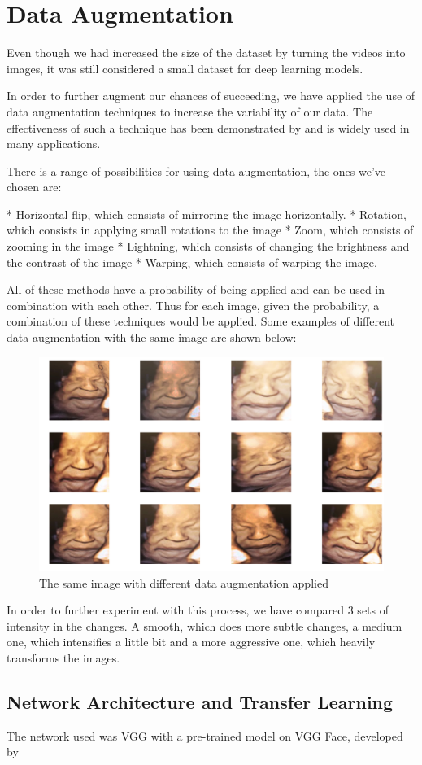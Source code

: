 \section{Data Augmentation}

Even though we had increased the size of the dataset by turning the videos into images, it was still considered a small dataset for deep learning models. 

In order to further augment our chances of succeeding, we have applied the use of data augmentation techniques to increase the variability of our data. The effectiveness of such a technique has been demonstrated by \cite{abs-1712-04621} and is widely used in many applications.

There is a range of possibilities for using data augmentation, the ones we've chosen are:

* Horizontal flip, which consists of mirroring the image horizontally. 
* Rotation, which consists in applying small rotations to the image
* Zoom, which consists of zooming in the image
* Lightning, which consists of changing the brightness and the contrast of the image
* Warping, which consists of warping the image. 

All of these methods have a probability of being applied and can be used in combination with each other. Thus for each image, given the probability, a combination of these techniques would be applied. Some examples of different data augmentation with the same image are shown below:

\begin{figure}[h!tp]
    \centering
    \includegraphics[width=.9\textwidth]{imgs/chap3_data_augmentation.png}
    \caption{The same image with different data augmentation applied}
    \label{fig:data_augmentation}
\end{figure}

In order to further experiment with this process, we have compared 3 sets of intensity in the changes. A smooth, which does more subtle changes, a medium one, which intensifies a little bit and a more aggressive one, which heavily transforms the images.  

\subsection{Network Architecture and Transfer Learning}

The network used was VGG with a pre-trained model on VGG Face, developed by \citeauthor{ParkhiVZ15}



